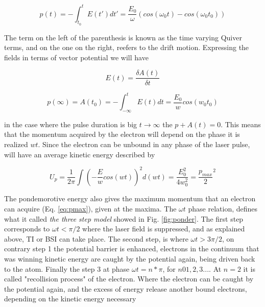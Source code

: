\begin{equation}
p(t)=-\int_{t_{0}}^{t} E(t\prime)dt\prime = \dfrac{E_{0}}{\omega} (cos(\omega_{0} t)- cos(\omega_{0} t_{0}))
\end{equation}

The term on the left of the parenthesis is known as the time varying Quiver terms, and on the one on the right, reefers to the drift motion. 
Expressing the fields in terms of vector potential we will have

\begin{equation}
E(t) = \dfrac{\delta A(t)}{\delta t}
\end{equation}

\begin{equation}
p(\infty) = A(t_{0}) = -\int_{-\infty}^{t} E(t) dt = \dfrac{E_{0}}{w} cos(w_{0}t_{0})
\label{eq:pmax}
\end{equation}

in the case where the pulse  duration is big $t \longrightarrow \infty$ the $p + A(t) = 0$. This means that the momentum acquired by the electron will depend on the phase it is realized $wt$. Since the electron can be unbound in any phase of the laser pulse, will have an average kinetic energy described by

\begin{equation} 
U_{p} = \dfrac{1}{2\pi} \int (-\dfrac{E}{w} cos (wt))^{2}d(wt) = \dfrac{E^{2}_{0}}{4w^{2}_{0}} = \dfrac{p_{max}}{2}^{2}
\label{eq:pondeenergy}
\end{equation}

The pondemorotive energy also gives the maximum momentum that an electron can acquire (Eq. \ref{eq:pmax}), given at the maxima. The $\omega t$ phase relation, defines what it called \textit{the three step model} showed in Fig. \ref{fig:ponder}. The first step corresponds to $\omega t < \pi /2$ where the laser field is suppressed, and as explained above, TI or BSI can take place. The second step, is where $\omega t > 3\pi /2$, on contrary step 1 the potential barrier is enhanced, electrons in the continuum that was winning kinetic energy are caught by the potential again, being driven  back to the atom. Finally the step 3 at phase $\omega t = n* \pi$, for $n 0 1,2,3...$. At $n=2$ it is called "recollision process" of the electron. Where the electron can be caught by the potential again, and the excess of energy release another bound electrons, depending on the kinetic energy necessary \cite{krishnan_ignition_2012}

